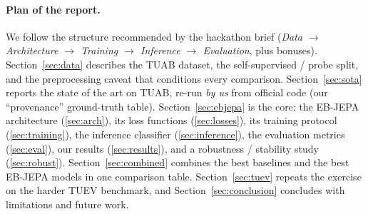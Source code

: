\documentclass[10pt,a4paper]{article}
\begin{document}
\paragraph{Plan of the report.} We follow the structure recommended by the hackathon brief
(\textit{Data $\to$ Architecture $\to$ Training $\to$ Inference $\to$ Evaluation}, plus bonuses).
Section~\ref{sec:data} describes the TUAB dataset, the self-supervised / probe split, and the preprocessing
caveat that conditions every comparison. Section~\ref{sec:sota} reports the state of the art on TUAB,
re-run \emph{by us} from official code (our ``provenance'' ground-truth table). Section~\ref{sec:ebjepa}
is the core: the EB-JEPA architecture (\ref{sec:arch}), its loss functions (\ref{sec:losses}), its training
protocol (\ref{sec:training}), the inference classifier (\ref{sec:inference}), the evaluation metrics
(\ref{sec:eval}), our results (\ref{sec:results}), and a robustness / stability study (\ref{sec:robust}).
Section~\ref{sec:combined} combines the best baselines and the best EB-JEPA models in one comparison table.
Section~\ref{sec:tuev} repeats the exercise on the harder TUEV benchmark, and Section~\ref{sec:conclusion}
concludes with limitations and future work.
\end{document}
